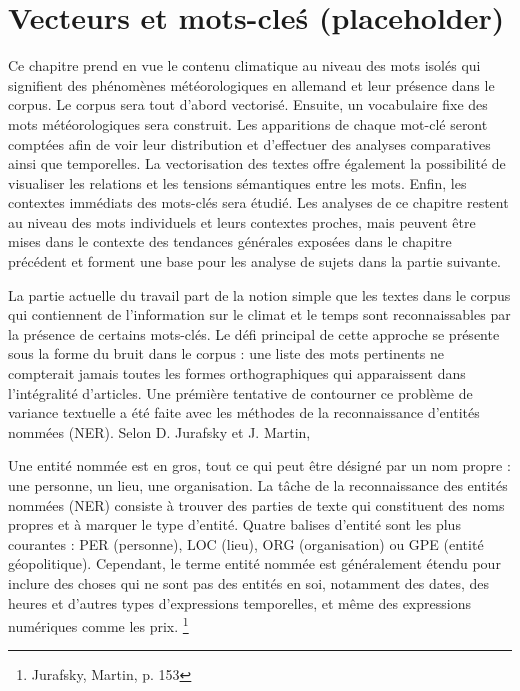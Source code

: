 \documentclass[a4paper,twoside,12pt]{article}
\begin{document}
\clearpage

\section{Vecteurs et mots-cleś (placeholder)} \label{vecteurs_etc}

Ce chapitre prend en vue le contenu \og climatique \fg{} au niveau des mots isolés qui signifient des phénomènes météorologiques en allemand et leur présence dans le corpus. Le corpus sera tout d'abord vectorisé. Ensuite, un vocabulaire fixe des mots \og météorologiques \fg{} sera construit. Les apparitions de chaque mot-clé seront comptées afin de voir leur distribution et d'effectuer des analyses comparatives ainsi que temporelles. La vectorisation des textes offre également la possibilité de visualiser les relations et les tensions sémantiques entre les mots. Enfin, les contextes immédiats des mots-clés sera étudié. Les analyses de ce chapitre restent au niveau des mots individuels et leurs contextes proches, mais peuvent être mises dans le contexte des tendances générales exposées dans le chapitre précédent et forment une base pour les analyse de sujets dans la partie suivante.

La partie actuelle du travail part de la notion simple que les textes dans le corpus qui contiennent de l'information sur le climat et le temps sont reconnaissables par la présence de certains mots-clés. Le défi principal de cette approche se présente sous la forme du bruit dans le corpus : une liste des mots pertinents ne compterait jamais toutes les formes orthographiques qui apparaissent dans l'intégralité d'articles. Une prémière tentative de contourner ce problème de variance textuelle a été faite avec les méthodes de la reconnaissance d'entités nommées (NER). Selon D. Jurafsky et J. Martin, 

\begin{displayquote} Une entité nommée est en gros, tout ce qui peut être désigné par un nom propre : une personne, un lieu, une organisation. La tâche de la reconnaissance des entités nommées (NER) consiste à trouver des parties de texte qui constituent des noms propres et à marquer le type d'entité. Quatre balises d'entité sont les plus courantes : PER (personne), LOC (lieu), ORG (organisation) ou GPE (entité géopolitique). Cependant, le terme entité nommée est généralement étendu pour inclure des choses qui ne sont pas des entités en soi, notamment des dates, des heures et d'autres types d'expressions temporelles, et même des expressions numériques comme les prix. \footnote{Jurafsky, Martin, p. 153} \end{displayquote}
\end{document}
